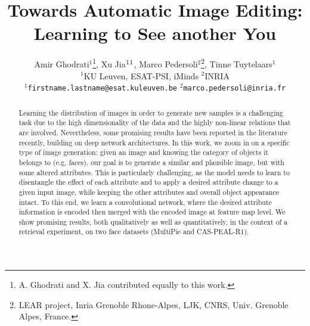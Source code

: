 \documentclass[10pt,twocolumn,letterpaper]{article}
\begin{document}
\title{Towards Automatic Image Editing: Learning to See another You}

\author{Amir Ghodrati$^{1}$\thanks{A. Ghodrati and X. Jia contributed equally to this work.},
Xu Jia$^{1}\footnotemark[1]$, Marco Pedersoli$^2$\thanks{LEAR project, Inria Grenoble Rhone-Alpes, LJK, CNRS, Univ. Grenoble Alpes, France.}, Tinne Tuytelaars$^1$ \\
$^{1}$KU Leuven, ESAT-PSI, iMinds \qquad  $^{2}$INRIA \\
$^{1}${\tt\small firstname.lastname@esat.kuleuven.be} \quad $^{2}${\tt\small marco.pedersoli@inria.fr}\\
}

\maketitle

\begin{abstract}
Learning the distribution of images in order to generate new samples
is a challenging task due to the high dimensionality of the data and
the highly non-linear relations that are involved.
Nevertheless, some promising results have been reported in the literature recently,
building on deep network architectures.
In this work, we zoom in on a specific type of image generation:
given an image and knowing the category of objects it belongs to (e.g. faces),
our goal is to generate a similar and plausible image, but with some altered attributes.
This is particularly challenging, as the model needs to learn to disentangle
the effect of each attribute and to apply a desired attribute change to a given input image, while keeping the other attributes and overall object appearance intact.
To this end, we learn a convolutional network, where the desired attribute information
is encoded then merged with the encoded image at feature map level.
We show promising results, both qualitatively as well as quantitatively, in the context of a retrieval experiment, on two face datasets (MultiPie and CAS-PEAL-R1).
\end{abstract}

\end{document}
